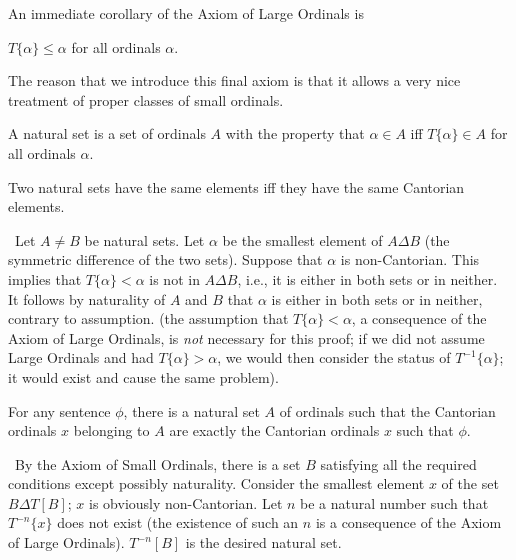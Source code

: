 An immediate corollary of the Axiom of Large Ordinals is

\begin{cor}
 $T\{\alpha\} \leq \alpha$ for all ordinals
 $\alpha$. 
\end{cor}

The reason that we introduce this final axiom is that it allows a very nice
treatment of proper classes of small ordinals.

\begin{definition}
 A {\upshape natural set} is a set of ordinals $A$ with
 the property that $\alpha \in A$ iff $T\{\alpha\} \in A$ for all
 ordinals $\alpha$.
\end{definition}

\begin{thm}
 Two natural sets have the same elements iff they have
 the same Cantorian elements.
\end{thm}

\preuve\ Let $A \neq B$ be natural sets.  Let $\alpha$ be the
smallest element of $A \Delta B$ (the symmetric difference of the two 
sets).  Suppose that $\alpha$ is non-Cantorian.  This implies that
$T\{\alpha\}< \alpha$ is not in $A \Delta B$,
i.e., it is either in 
both sets or in neither.  It follows by naturality of $A$ and $B$ that
$\alpha$ is either in both sets or in neither, contrary to assumption.
(the assumption that $T\{\alpha\}< \alpha$, a consequence of the Axiom
of Large Ordinals, is {\itshape not\/} necessary for this proof; if we did
not assume Large Ordinals and had $T\{\alpha\}> \alpha$, we would then
consider the status of $T^{-1}\{\alpha\}$; it would exist and cause
the same problem).
\finpreuve

\begin{thm}
 For any sentence $\phi$, there is a natural set $A$ of
 ordinals such that the Cantorian ordinals $x$ belonging
 to $A$ are exactly the Cantorian ordinals $x$ such
 that $\phi$.
\end{thm}

\preuve\ By the Axiom of Small Ordinals, there
is a set $B$ satisfying all the required conditions except possibly naturality.
Consider the smallest element $x$ of the set $B \Delta T[B]$; $x$ is
obviously non-Cantorian.  Let $n$ be a natural number
such that $T^{-n}\{x\}$ does not exist (the existence of such an $n$ is a
consequence of the Axiom of Large Ordinals). $T^{-n}[B]$ is the
desired natural set.
\finpreuve


